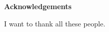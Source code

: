 


\begin{quoting}
  \singlespace
    \begin{center}
  {\LARGE \bfseries  Acknowledgements}\\
  \vspace*{0.5cm}
  \end{center}
\noindent
I want to thank all these people.

\end{quoting}






